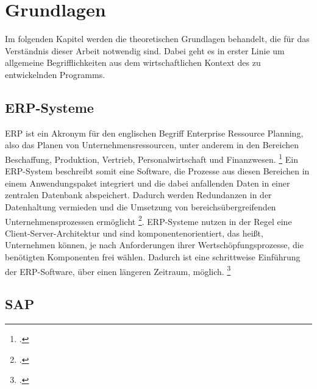 \section{Grundlagen}
Im folgenden Kapitel werden die theoretischen Grundlagen behandelt, die für das Verständnis dieser Arbeit notwendig sind. Dabei geht es in erster Linie um allgemeine Begrifflichkeiten aus dem wirtschaftlichen Kontext des zu entwickelnden Programms.

\subsection{ERP-Systeme}
ERP ist ein Akronym für den englischen Begriff \glqq{}Enterprise Ressource Planning\grqq{}, also das Planen von Unternehmensressourcen, unter anderem in den Bereichen Beschaffung, Produktion, Vertrieb, Personalwirtschaft und Finanzwesen. \footcite[Vgl.][523]{wibuch} Ein ERP-System beschreibt somit eine Software, die Prozesse aus diesen Bereichen in einem Anwendungspaket integriert und die dabei anfallenden Daten in einer zentralen Datenbank abspeichert. Dadurch werden Redundanzen in der Datenhaltung vermieden und die Umsetzung von bereichsübergreifenden Unternehmensprozessen ermöglicht \footcite[Vgl.][523]{wibuch}. ERP-Systeme nutzen in der Regel eine Client-Server-Architektur und sind komponentenorientiert, das heißt, Unternehmen können, je nach Anforderungen ihrer Wertschöpfungsprozesse, die benötigten Komponenten frei wählen. Dadurch ist eine schrittweise Einführung der ERP-Software, über einen längeren Zeitraum, möglich. \footcite[Vgl.][524 f.]{wibuch}

\subsection{SAP}
